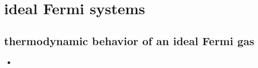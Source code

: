 \chapter{ideal Fermi systems}
\section{thermodynamic behavior of an ideal Fermi gas}
\begin{itemize}
	\item 
\end{itemize}
